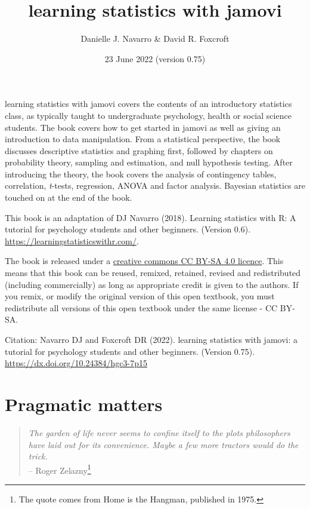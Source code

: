 \documentclass[
]{book}
\title{{learning statistics with jamovi}}
\author{Danielle J. Navarro \& David R. Foxcroft}
\date{23 June 2022 (version 0.75)}
\begin{document}
\maketitle

{
\setcounter{tocdepth}{1}
\tableofcontents
}
\hypertarget{section}{%
\chapter*{}\label{section}}

{learning statistics with jamovi} covers the contents of an introductory statistics class, as typically taught to undergraduate psychology, health or social science students. The book covers how to get started in jamovi as well as giving an introduction to data manipulation. From a statistical perspective, the book discusses descriptive statistics and graphing first, followed by chapters on probability theory, sampling and estimation, and null hypothesis testing. After introducing the theory, the book covers the analysis of contingency tables, correlation, \emph{t}-tests, regression, ANOVA and factor analysis. Bayesian statistics are touched on at the end of the book.

This book is an adaptation of DJ Navarro (2018). Learning statistics with R: A tutorial for psychology students and other beginners. (Version 0.6). \url{https://learningstatisticswithr.com/}.

The book is released under a \href{https://creativecommons.org/licenses/by-sa/4.0/}{creative commons CC BY-SA 4.0 licence}. This means that this book can be reused, remixed, retained, revised and redistributed (including commercially) as long as appropriate credit is given to the authors. If you remix, or modify the original version of this open textbook, you must redistribute all versions of this open textbook under the same license - CC BY-SA.

Citation: Navarro DJ and Foxcroft DR (2022). learning statistics with jamovi: a tutorial for psychology students and other beginners. (Version 0.75). \href{DOI:\%2010.24384/hgc3-7p15}{https://dx.doi.org/10.24384/hgc3-7p15}

\hypertarget{pragmatic-matters}{%
\chapter{Pragmatic matters}\label{pragmatic-matters}}

\begin{quote}
\emph{The garden of life never seems to confine itself to the plots philosophers have laid out for its convenience. Maybe a few more tractors would do the trick.}\\
-- Roger Zelazny\footnote{The quote comes from Home is the Hangman, published in 1975.}
\end{quote}
\end{document}
